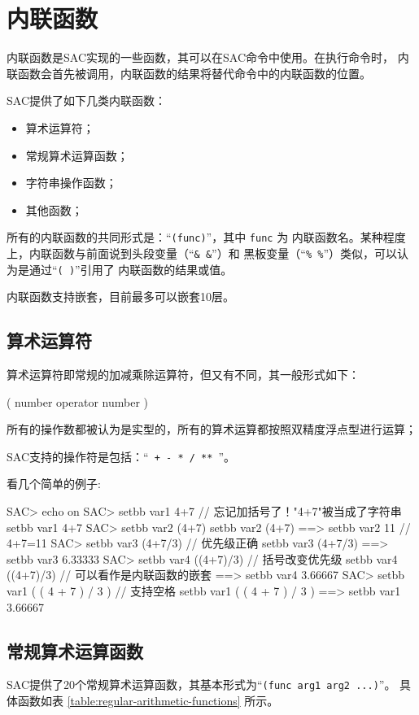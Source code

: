 \section{内联函数}

内联函数是SAC实现的一些函数，其可以在SAC命令中使用。在执行命令时，
内联函数会首先被调用，内联函数的结果将替代命令中的内联函数的位置。

SAC提供了如下几类内联函数：
\begin{itemize}
\item 算术运算符；
\item 常规算术运算函数；
\item 字符串操作函数；
\item 其他函数；
\end{itemize}

所有的内联函数的共同形式是：``\texttt{(func)}''，其中 \texttt{func} 为
内联函数名。某种程度上，内联函数与前面说到头段变量（``\verb|& &|''）和
黑板变量（``\verb|% %|''）类似，可以认为是通过``\texttt{( )}''引用了
内联函数的结果或值。

内联函数支持嵌套，目前最多可以嵌套10层。

\subsection{算术运算符}
算术运算符即常规的加减乘除运算符，但又有不同，其一般形式如下：
\begin{SACCode}
    ( number operator number )
\end{SACCode}
所有的操作数都被认为是实型的，所有的算术运算都按照双精度浮点型进行运算；

SAC支持的操作符是包括：``\texttt{ +  -  *  /  ** }''。

看几个简单的例子:
\begin{SACCode}
SAC> echo on
SAC> setbb var1 4+7             // 忘记加括号了！"4+7"被当成了字符串
 setbb var1 4+7
SAC> setbb var2 (4+7)
 setbb var2 (4+7)
 ==>  setbb var2 11             // 4+7=11
SAC> setbb var3 (4+7/3)         // 优先级正确
 setbb var3 (4+7/3)
 ==>  setbb var3 6.33333
SAC> setbb var4 ((4+7)/3)       // 括号改变优先级
 setbb var4 ((4+7)/3)           // 可以看作是内联函数的嵌套
 ==>  setbb var4 3.66667
SAC> setbb var1 ( ( 4 + 7 ) / 3 )   // 支持空格
 setbb var1 ( ( 4 + 7 ) / 3 )
 ==>  setbb var1 3.66667
\end{SACCode}

\subsection{常规算术运算函数}
SAC提供了20个常规算术运算函数，其基本形式为``\texttt{(func arg1 arg2 ...)}''。
具体函数如表 \ref{table:regular-arithmetic-functions} 所示。

